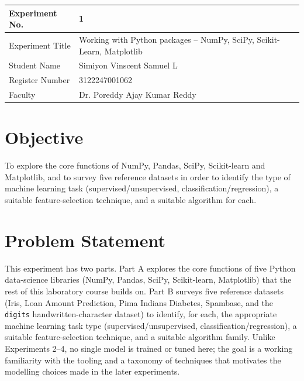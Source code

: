 \documentclass[12pt,a4paper]{article}
\begin{document}
\begin{tabular}{|p{4cm}|p{11cm}|}
\hline
Experiment No. & 1 \\ \hline
Experiment Title & Working with Python packages -- NumPy, SciPy, Scikit-Learn,
Matplotlib\footnotemark\\ \hline
Student Name & Simiyon Vinscent Samuel L \\ \hline
Register Number & 3122247001062 \\ \hline
Faculty & Dr. Poreddy Ajay Kumar Reddy \\ \hline
\end{tabular}

\section{Objective}
To explore the core functions of NumPy, Pandas, SciPy, Scikit-learn and Matplotlib, and
to survey five reference datasets in order to identify the type of machine learning task
(supervised/unsupervised, classification/regression), a suitable feature-selection
technique, and a suitable algorithm for each.

\section{Problem Statement}
This experiment has two parts. Part A explores the core functions of five Python
data-science libraries (NumPy, Pandas, SciPy, Scikit-learn, Matplotlib) that the rest of
this laboratory course builds on. Part B surveys five reference datasets (Iris, Loan
Amount Prediction, Pima Indians Diabetes, Spambase, and the \texttt{digits}
handwritten-character dataset) to identify, for each, the appropriate machine learning
task type (supervised/unsupervised, classification/regression), a suitable
feature-selection technique, and a suitable algorithm family. Unlike Experiments 2--4, no
single model is trained or tuned here; the goal is a working familiarity with the
tooling and a taxonomy of techniques that motivates the modelling choices made in the
later experiments.
\end{document}
